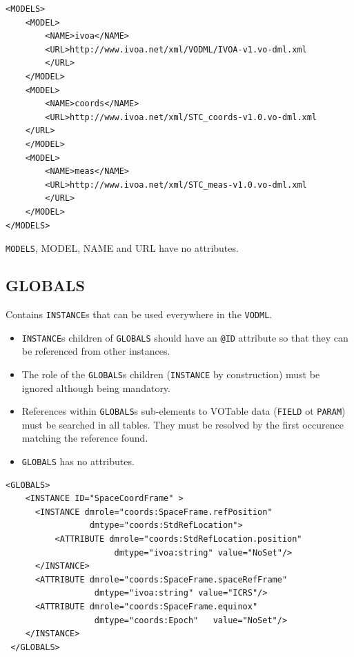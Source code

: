 \documentclass[11pt,a4paper]{ivoa}
\begin{document}
\begin{lstlisting}[caption={GLOBALS block example},style=XML]
<MODELS>
    <MODEL>
        <NAME>ivoa</NAME>
        <URL>http://www.ivoa.net/xml/VODML/IVOA-v1.vo-dml.xml
        </URL>
    </MODEL>
    <MODEL>
        <NAME>coords</NAME>
        <URL>http://www.ivoa.net/xml/STC_coords-v1.0.vo-dml.xml
    </URL>
    </MODEL>
    <MODEL>
        <NAME>meas</NAME>
        <URL>http://www.ivoa.net/xml/STC_meas-v1.0.vo-dml.xml
        </URL>
    </MODEL>
</MODELS>
\end{lstlisting}

 \texttt{MODELS},  {MODEL},  {NAME} and {URL}  have no attributes. 
 

%
%
\clearpage
\subsection{GLOBALS}
 Contains  \texttt{INSTANCE}s  that can be used everywhere in the \texttt{VODML}.
\begin{itemize}
    \item \texttt{INSTANCE}s children of \texttt{GLOBALS} should have an  \texttt{@ID} attribute so that they can be referenced from other instances.
    \item The role of the \texttt{GLOBALS}s children (\texttt{INSTANCE} by construction) must be ignored although being mandatory.
    \item References within \texttt{GLOBALS}s  sub-elements to VOTable data (\texttt{FIELD} ot \texttt{PARAM}) must be searched in all tables. 
            They must be resolved by the first occurence matching the reference found.
    \item \texttt{GLOBALS} has no attributes. 
\end{itemize}

\begin{lstlisting}[caption={GLOBALS block example},style=XML]
  <GLOBALS>
    <INSTANCE ID="SpaceCoordFrame" >
      <INSTANCE dmrole="coords:SpaceFrame.refPosition" 
                 dmtype="coords:StdRefLocation">
          <ATTRIBUTE dmrole="coords:StdRefLocation.position" 
                      dmtype="ivoa:string" value="NoSet"/>
      </INSTANCE>
      <ATTRIBUTE dmrole="coords:SpaceFrame.spaceRefFrame" 
                  dmtype="ivoa:string" value="ICRS"/>
      <ATTRIBUTE dmrole="coords:SpaceFrame.equinox" 
                  dmtype="coords:Epoch"   value="NoSet"/>
    </INSTANCE>
 </GLOBALS>
\end{lstlisting}
\end{document}
